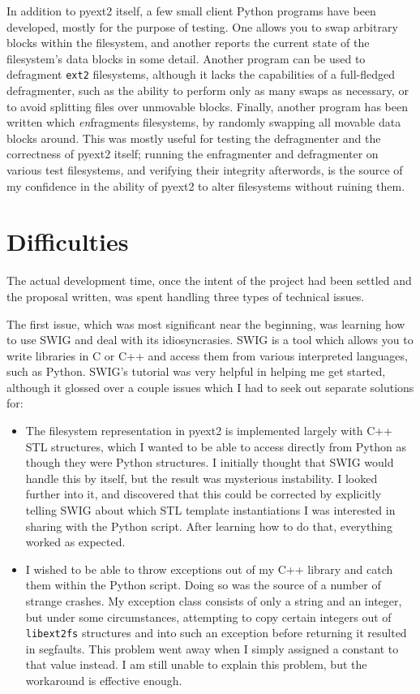 \documentclass[10pt]{article}
\begin{document}
In addition to pyext2 itself, a few small client Python programs have been developed, mostly for the purpose of testing. One allows you to swap arbitrary blocks within the filesystem, and another reports the current state of the filesystem's data blocks in some detail. Another program can be used to defragment \texttt{ext2} filesystems, although it lacks the capabilities of a full-fledged defragmenter, such as the ability to perform only as many swaps as necessary, or to avoid splitting files over unmovable blocks. Finally, another program has been written which \emph{en}fragments filesystems, by randomly swapping all movable data blocks around. This was mostly useful for testing the defragmenter and the correctness of pyext2 itself; running the enfragmenter and defragmenter on various test filesystems, and verifying their integrity afterwords, is the source of my confidence in the ability of pyext2 to alter filesystems without ruining them.

\section{Difficulties}

The actual development time, once the intent of the project had been settled and the proposal written, was spent handling three types of technical issues.

The first issue, which was most significant near the beginning, was learning how to use SWIG and deal with its idiosyncrasies. SWIG is a tool which allows you to write libraries in C or C++ and access them from various interpreted languages, such as Python. SWIG's tutorial was very helpful in helping me get started, although it glossed over a couple issues which I had to seek out separate solutions for:
\begin{itemize}
 \item The filesystem representation in pyext2 is implemented largely with C++ STL structures, which I wanted to be able to access directly from Python as though they were Python structures. I initially thought that SWIG would handle this by itself, but the result was mysterious instability. I looked further into it, and discovered that this could be corrected by explicitly telling SWIG about which STL template instantiations I was interested in sharing with the Python script. After learning how to do that, everything worked as expected.
 \item I wished to be able to throw exceptions out of my C++ library and catch them within the Python script. Doing so was the source of a number of strange crashes. My exception class consists of only a string and an integer, but under some circumstances, attempting to copy certain integers out of \texttt{libext2fs} structures and into such an exception before returning it resulted in segfaults. This problem went away when I simply assigned a constant to that value instead. I am still unable to explain this problem, but the workaround is effective enough.
\end{itemize}
\end{document}
